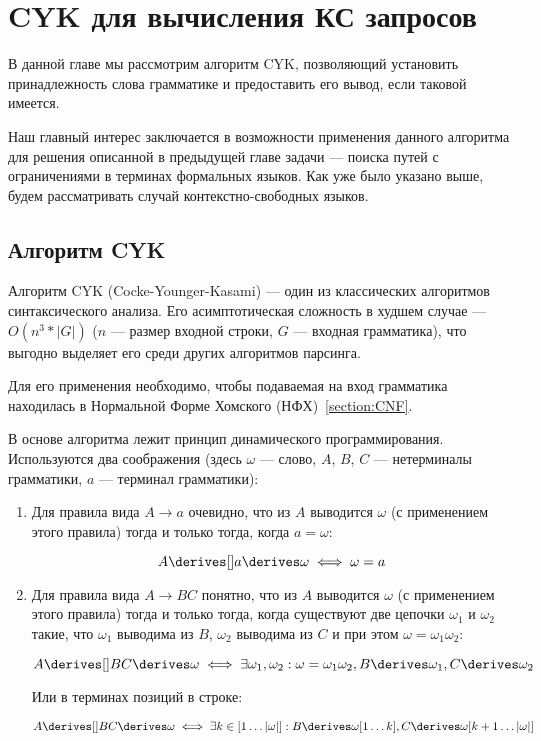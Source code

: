 \section{CYK для вычисления КС запросов}

В данной главе мы рассмотрим алгоритм CYK, позволяющий установить принадлежность слова грамматике и предоставить его вывод, если таковой имеется.

Наш главный интерес заключается в возможности применения данного алгоритма для решения описанной в предыдущей главе задачи --- поиска путей с ограничениями в терминах формальных языков. Как уже было указано выше, будем рассматривать случай контекстно-свободных языков.

\subsection{Алгоритм CYK}

Алгоритм CYK (Cocke-Younger-Kasami) –-- один из классических алгоритмов синтаксического анализа. Его асимптотическая сложность в худшем случае --- $O(n^3 * |G|)$ ($n$ --- размер входной строки, $G$ --- входная грамматика), что выгодно выделяет его среди других алгоритмов парсинга.

Для его применения необходимо, чтобы подаваемая на вход грамматика находилась в Нормальной Форме Хомского (НФХ)~\ref{section:CNF}.  

В основе алгоритма лежит принцип динамического программирования. Используются два соображения (здесь $\omega$ --- слово, $A$, $B$, $C$ --- нетерминалы грамматики, $a$ --- терминал грамматики):  

\begin{enumerate}
\item Для правила вида $A \to a$ очевидно, что из $A$ выводится $\omega$ (с применением этого правила) тогда и только тогда, когда $a = \omega$:

\[
  A \derives[] a \derives \omega \iff \omega = a\]
  
\item Для правила вида $A \to B C$ понятно, что из $A$ выводится $\omega$ (с применением этого правила) тогда и только тогда, когда существуют две цепочки $\omega_1$ и $\omega_2$ такие, что $\omega_1$ выводима из $B$, $\omega_2$ выводима из $C$ и при этом $\omega = \omega_1 \omega_2$: 

\[A \derives[] B C \derives \omega \iff \exists \omega_1, \omega_2 : \omega = \omega_1 \omega_2, B \derives \omega_1, C \derives \omega_2\]

Или в терминах позиций в строке: 

\[A \derives[] B C \derives \omega \iff \exists k \in [1 \dots |\omega|] : B \derives \omega[1 \dots k], C \derives \omega[k+1 \dots |\omega|]\]
\end{enumerate}

